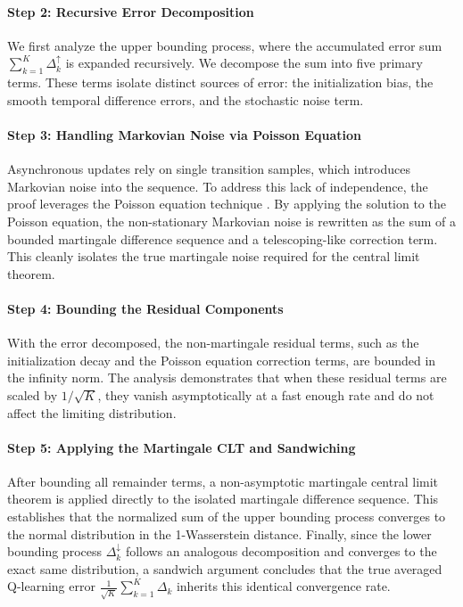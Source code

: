 \documentclass{opt2025} %
\begin{document}
\paragraph{Step 2: Recursive Error Decomposition} We first analyze the upper bounding process, where the accumulated error sum $\sum_{k=1}^K \Delta_k^\uparrow$ is expanded recursively. We decompose the sum into five primary terms. These terms isolate distinct sources of error: the initialization bias, the smooth temporal difference errors, and the stochastic noise term.

\paragraph{Step 3: Handling Markovian Noise via Poisson Equation} Asynchronous updates rely on single transition samples, which introduces Markovian noise into the sequence. To address this lack of independence, the proof leverages the Poisson equation technique \citep{glynn1996liapounov, douc2018markov, makowski2002poisson, chen2020explicit}. By applying the solution to the Poisson equation, the non-stationary Markovian noise is rewritten as the sum of a bounded martingale difference sequence and a telescoping-like correction term. This cleanly isolates the true martingale noise required for the central limit theorem.

\paragraph{Step 4: Bounding the Residual Components} With the error decomposed, the non-martingale residual terms, such as the initialization decay and the Poisson equation correction terms, are bounded in the infinity norm. The analysis demonstrates that when these residual terms are scaled by $1/\sqrt{K}$, they vanish asymptotically at a fast enough rate and do not affect the limiting distribution.

\paragraph{Step 5: Applying the Martingale CLT and Sandwiching} After bounding all remainder terms, a non-asymptotic martingale central limit theorem is applied directly to the isolated martingale difference sequence. This establishes that the normalized sum of the upper bounding process converges to the normal distribution in the 1-Wasserstein distance. Finally, since the lower bounding process $\Delta_k^\downarrow$ follows an analogous decomposition and converges to the exact same distribution, a sandwich argument concludes that the true averaged Q-learning error $\frac{1}{\sqrt{K}}\sum_{k=1}^K \Delta_k$ inherits this identical convergence rate.
\end{document}
